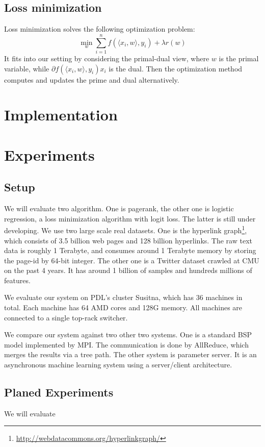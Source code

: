 \documentclass{acm_proc_article-sp}
\begin{document}
\subsection{Loss minimization}

Loss minimization solves the following optimization problem:
\begin{equation}
  \min_w \sum_{i=1}^{n} f(\langle x_i, w\rangle, y_i) + \lambda r(w)
\end{equation}
It fits into our setting by considering the primal-dual view, where $w$ is the primal
variable, while $\partial f(\langle x_i, w\rangle, y_i) x_i$ is the dual. Then
the optimization method computes and updates the prime and dual alternatively.


\section{Implementation}

\section{Experiments}

\subsection{Setup}

We will evaluate two algorithm. One is pagerank, the other one is logistic
regression, a loss minimization algorithm with logit loss. The latter is still
under developing. We use two large scale real datasets. One is the hyperlink
graph\footnote{\url{http://webdatacommons.org/hyperlinkgraph/}}, which consists
of 3.5 billion web pages and 128 billion hyperlinks. The raw text data is
roughly 1 Terabyte, and consumes around 1 Terabyte memory by storing the page-id
by 64-bit integer. The other one is a Twitter dataset crawled at CMU on the past
4 years. It has around 1 billion of samples and hundreds millions of
features.

We evaluate our system on PDL's cluster Susitna, which has 36 machines in
total. Each machine has 64 AMD cores and 128G memory. All machines are connected
to a single top-rack switcher.

We compare our system against two other two systems. One is a standard BSP
model implemented by MPI. The communication is done by AllReduce, which merges
the results via a tree path. The other system is parameter server. It is an
asynchronous machine learning system using a server/client architecture.

\subsection{Planed Experiments}

We will evaluate




\end{document}
